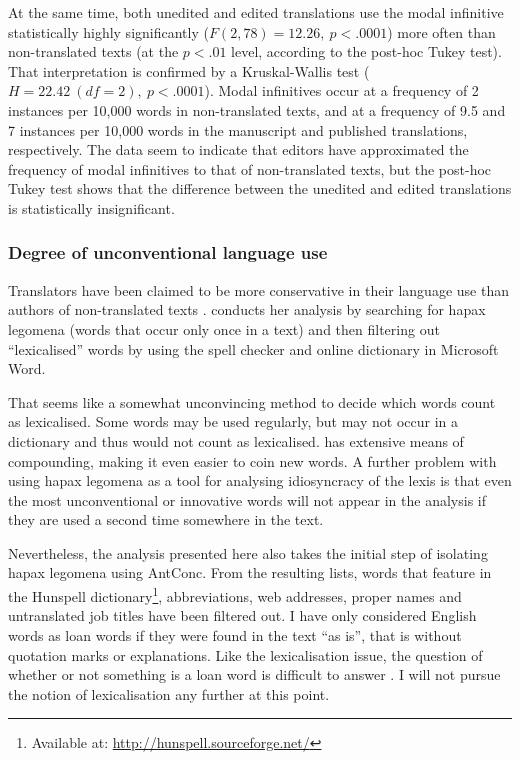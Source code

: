 \documentclass[output=paper]{LSP/langsci}
\begin{document}
At the same time, both unedited and edited translations use the modal infinitive statistically highly significantly ($F(2,78)=12.26,~p<.0001$) more often than non-translated texts (at the $p<.01$ level, according to the post-hoc Tukey test). That interpretation is confirmed by a Kruskal-Wallis test ($H=22.42~(df=2),~p<.0001$). Modal infinitives occur at a frequency of 2 instances per 10,000 words in non-translated texts, and at a frequency of 9.5 and 7 instances per 10,000 words in the manuscript and published translations, respectively. The data seem to indicate that editors have approximated the frequency of modal infinitives to that of non-translated texts, but the post-hoc Tukey test shows that the difference between the unedited and edited translations is statistically insignificant.

\subsubsection{Degree of unconventional language use}

Translators have been claimed to be more conservative in their language use than authors of non-translated texts \parencite[242]{berfer11}. \textcite{kruger12} conducts her analysis by searching for hapax legomena (words that occur only once in a text) and then filtering out \enquote{lexicalised} words by using the spell checker and online dictionary in Microsoft Word.

That seems like a somewhat unconvincing method to decide which words count as lexicalised. Some words may be used regularly, but may not occur in a dictionary and thus would not count as lexicalised.  has extensive means of compounding, making it even easier to coin new words. A further problem with using hapax legomena as a tool for analysing idiosyncracy of the lexis is that even the most unconventional or innovative words will not appear in the analysis if they are used a second time somewhere in the text.

Nevertheless, the analysis presented here also takes the initial step of isolating hapax legomena using AntConc. From the resulting lists, words that feature in the Hunspell dictionary\footnote{Available at: \url{http://hunspell.sourceforge.net/}}, abbreviations, web addresses, proper names and untranslated job titles have been filtered out. I have only considered English words as loan words if they were found in the text \enquote{as is}, that is without quotation marks or explanations. Like the lexicalisation issue, the question of whether or not something is a loan word is difficult to answer \parencite{heller02}. I will not pursue the notion of lexicalisation any further at this point.
\end{document}
